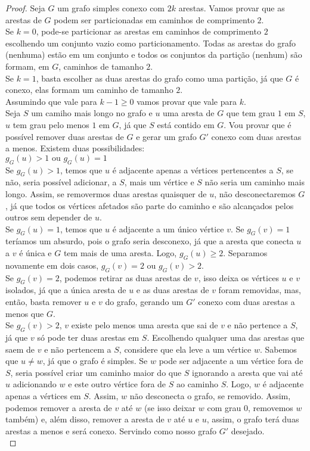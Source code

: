 \documentclass[12pt]{article}
\begin{document}
\begin{proof}
Seja $G$ um grafo simples conexo com $2k$ arestas. Vamos provar que as arestas de $G$ podem ser particionadas em caminhos de comprimento $2$. \\
Se $k = 0$, pode-se particionar as arestas em caminhos de comprimento $2$ escolhendo um conjunto vazio como particionamento. Todas as arestas do grafo (nenhuma) estão em um conjunto e todos os conjuntos da partição (nenhum) são formam, em $G$, caminhos de tamanho $2$. \\
Se $k = 1$, basta escolher as duas arestas do grafo como uma partição, já que $G$ é conexo, elas formam um caminho de tamanho $2$. \\
Assumindo que vale para $k - 1 \geq 0$ vamos provar que vale para $k$. \\
Seja $S$ um camiho mais longo no grafo e $u$ uma aresta de $G$ que tem grau $1$ em $S$, $u$ tem grau pelo menos $1$ em $G$, já que $S$ está contido em $G$. Vou provar que é possível remover duas arestas de $G$ e gerar um grafo $G'$ conexo com duas arestas a menos. Existem duas possibilidades: \\
$g_G(u) > 1 \text{ ou } g_G(u) = 1$ \\
Se $g_G(u) > 1$, temos que $u$ é adjacente apenas a vértices pertencentes a $S$, se não, seria possível adicionar, a $S$, mais um vértice e $S$ não seria um caminho mais longo. Assim, se removermos duas arestas quaisquer de $u$, não desconectaremos $G$, já que todos os vértices afetados são parte do caminho e são alcançados pelos outros sem depender de $u$. \\
Se $g_G(u) = 1$, temos que $u$ é adjacente a um único vértice $v$. Se $g_G(v) = 1$ teríamos um absurdo, pois o grafo seria desconexo, já que a aresta que conecta $u$ a $v$ é única e $G$ tem mais de uma aresta. Logo, $g_G(u) \geq 2$. Separamos novamente em dois casos, $g_G(v) = 2 \text{ ou } g_G(v) > 2$. \\
Se $g_G(v) = 2$, podemos retirar as duas arestas de $v$, isso deixa os vértices $u$ e $v$ isolados, já que a única aresta de $u$ e as duas arestas de $v$ foram removidas, mas, então, basta remover $u$ e $v$ do grafo, gerando um $G'$ conexo com duas arestas a menos que $G$. \\
Se $g_G(v) > 2$, $v$ existe pelo menos uma aresta que sai de $v$ e não pertence a $S$, já que $v$ só pode ter duas arestas em $S$. Escolhendo qualquer uma das arestas que saem de $v$ e não pertencem a $S$, considere que ela leve a um vértice $w$. Sabemos que $u \neq w$, já que o grafo é simples. Se $w$ pode ser adjacente a um vértice fora de $S$, seria possível criar um caminho maior do que $S$ ignorando a aresta que vai até $u$ adicionando $w$ e este outro vértice fora de $S$ ao caminho $S$. Logo, $w$ é adjacente apenas a vértices em $S$. Assim, $w$ não desconecta o grafo, se removido. Assim, podemos remover a aresta de $v$ até $w$ (se isso deixar $w$ com grau $0$, removemos $w$ também) e, além disso, remover a aresta de $v$ até $u$ e $u$, assim, o grafo terá duas arestas a menos e será conexo. Servindo como nosso grafo $G'$ desejado. \\

\end{proof}
\end{document}
